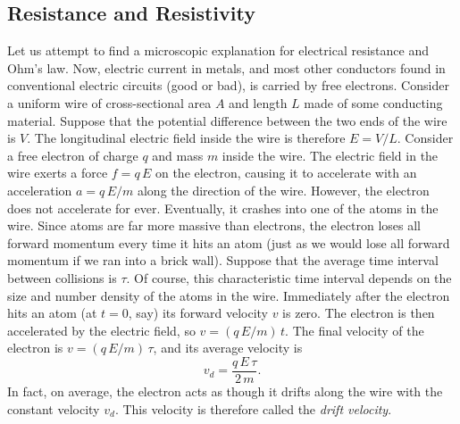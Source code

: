 \subsection{Resistance and Resistivity}\label{s7.3}
Let us attempt to find a microscopic explanation for electrical
resistance and Ohm's law. Now, electric current in metals, and most other conductors found 
in conventional electric circuits (good or bad), is carried by free electrons.
Consider a uniform  wire of cross-sectional area $A$ and length $L$ made of some
conducting material. Suppose that the potential difference between
the two ends of the wire is $V$. The longitudinal electric field inside
the wire is therefore $E=V/L$. Consider a free  electron
 of charge $q$ and mass $m$ inside the
wire. The electric field in the wire exerts a force $f=q\,E$ on the electron, causing
it to accelerate with an acceleration $a= q\,E/m$ along the direction of
the wire. However, the electron does not accelerate for ever. Eventually,
it crashes into one of the atoms in the wire. Since atoms are far more massive
than electrons, the electron loses all forward momentum every time it hits
an atom (just as we would lose all forward momentum if we ran into a brick wall). 
Suppose that the average  time interval  between
collisions is $\tau$. Of course,   this 
characteristic time interval depends on the size and number density of the atoms
in the wire. 
Immediately after the electron hits  an atom (at $t=0$, say)  its forward velocity $v$ is
zero. The electron is then accelerated by the electric
field, so $v = (q\,E/m)\,t$. The final velocity of the electron is
$v = (q\,E/m)\,\tau$, and its average velocity is
\begin{equation}
v_d = \frac{q\,E\,\tau}{2\,m}.
\end{equation}
In fact,  on average, the electron acts as though it drifts along the
wire with the constant velocity $v_d$. This velocity
 is therefore called the {\em drift velocity}.

